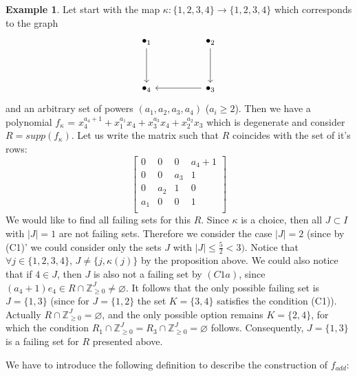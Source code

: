 \documentclass[reqno,12pt]{amsart}
\numberwithin{equation}{section}
\theoremstyle{plain}
\theoremstyle{definition}
\newtheorem{example}[theorem]{Example}
\newtheorem{definition}[theorem]{Definition}
\newcommand{\ZZ}{{\mathbb{Z}}}
\begin{document}
\begin{example}{\label{ea_f}}
    Let start with the map $\kappa:\{1,2,3,4\}\to \{1,2,3,4\}$ which corresponds to the graph
    \[\begin{tikzcd}
	{\bullet_1} && {\bullet_2} \\
	\\
	{\bullet_4} && {\bullet_3}
	\arrow[from=3-3, to=3-1]
	\arrow[from=1-1, to=3-1]
	\arrow[from=1-3, to=3-3]
\end{tikzcd}\]
and an arbitrary set of powers $(a_1,a_2,a_3,a_4)$ ($a_i \geq 2$). Then we have a polynomial $f_\kappa$ = $x_4^{a_4+1} + x_1^{a_1}x_4+x_3^{a_3}x_4+x_2^{a_2}x_3$ which is degenerate and consider $R = supp(f_\kappa)$. Let us write the matrix such that $R$ coincides with the set of it's rows:
\[
  \left[ {\begin{array}{cccc}
    0 & 0 & 0 & a_4+1 \\
    0 & 0 & a_3 & 1 \\
    0 & a_2 & 1 & 0 \\
     a_1 & 0 & 0 & 1 \\
  \end{array} } \right]
\]
We would like to find all failing sets for this $R$. Since $\kappa$ is a choice, then all $J \subset I$ with $|J|=1$ are not  failing sets. Therefore we consider the case $|J|=2$ (since by (C1)' we could consider only the sets $J$ with $|J| \leq \frac{5}{2} < 3) $. Notice that  $\forall j \in \{1,2,3,4\}$, $J \neq \{j, \kappa(j)\}$ by the proposition above.  We could also notice that if $4 \in J$, then $J$ is also not a failing set by $(C1a)$, since $(a_4+1)e_4 \in R\cap \ZZ_{\geq 0}^J \neq \varnothing$. It follows that the only possible failing set is $J = \{1,3\}$ (since for $J = \{1,2\}$ the set $K = \{3,4\}$ satisfies the condition (C1)). Actually $R\cap \ZZ_{\geq 0}^J = \varnothing$, and the only possible option remains $K = \{2,4\}$, for which the condition $R_1\cap \ZZ_{\geq 0}^J = R_3\cap \ZZ_{\geq 0}^J = \varnothing$ follows. Consequently, $J = \{1,3\}$ is a failing set for $R$ presented above.
\end{example}

We have to introduce the following definition to describe the construction of $f_{add}$:
\end{document}
